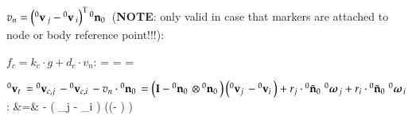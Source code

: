   \item $v_n = \left( \prescript{0}{}{\mathbf{v}}\,_j - \prescript{0}{}{\mathbf{v}}\,_i \right)^\mathrm{T} \prescript{0}{}{\mathbf{n}_0}\,$ ({\bf NOTE}: only valid in case that markers are attached to node or body reference point!!!):
  \be
  \ee
  \be
  \ee
  \item $f_c = k_c \cdot g + d_c \cdot v_n$:
  \be
     = 
     = 
  \ee
  \be
     = 
  \ee
\item $\prescript{0}{}{\mathbf{v}_t}\, = \prescript{0}{}{\mathbf{v}_{c,j}}\, - \prescript{0}{}{\mathbf{v}_{c,i}}\, - v_n \cdot \prescript{0}{}{\mathbf{n}_0}\,=
\left( \mathbf{I} - \prescript{0}{}{\mathbf{n}_0}\, \otimes \prescript{0}{}{\mathbf{n}_0}\,\right) \left( \prescript{0}{}{\mathbf{v}_j}\, -\prescript{0}{}{\mathbf{v}_i}\, \right) 
        + r_j \cdot \prescript{0}{}{\tilde {\mathbf{n}}_0}\, \prescript{0}{}{\mbox{\boldmath $\omega$ \unboldmath}\!\!}\,_{j} 
        + r_i \cdot \prescript{0}{}{\tilde {\mathbf{n}}_0}\, \prescript{0}{}{\mbox{\boldmath $\omega$ \unboldmath}\!\!}\,_{i}$:
  \bea
     &=& 
    - \otimes \left( _j - _i \right) \left(\left(\Im - \otimes {} \right)         \right) \nonumber\\

